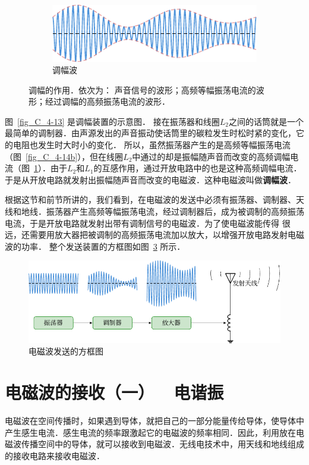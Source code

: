 \begin{figure}[htbp]
\begin{minipage}[b]{0.7\linewidth}
    	\\
    	\begin{subfigure}{0.9\linewidth}
    		\centering
    		\includegraphics{fig/C/4-14c.pdf}
    		\caption{调幅波}\label{fig_C_4-14c}
    	\end{subfigure}
    	\caption{调幅的作用．依次为：
    		声音信号的波形；高频等幅振荡电流的波形；经过调幅的高频振荡电流的波形．}\label{fig_C_4-14}
    \end{minipage}
\end{figure}



图~\ref{fig_C_4-13} 是调幅装置的示意图．
接在振荡器和线圈$L_2$之间的话筒就是一个最简单的调制器．由声源发出的声音振动使话筒里的碳粒发生时松时紧的变化，它的电阻也发生时大时小的变化．
所以，虽然振荡器产生的是高频等幅振荡电流
（图~\ref{fig_C_4-14b}），但在线圈$L_2$中通过的却是振幅随声音而改变的高频调幅电流（图~\ref{fig_C_4-14c}）．由于$L_2$和$L_1$的互感作用，通过开放电路中的也是这种高频调幅电流．
于是从开放电路就发射出振幅随声音而改变的电磁波．这种电磁波叫做\textbf{调幅波}．

根据这节和前节所讲的，我们看到，在电磁波的发送中必须有振荡器、调制器、天线和地线．振荡器产生高频等幅振荡电流，经过调制器后，成为被调制的高频振荡电流，于是开放电路就发射出带有调制信号的电磁波．为了使电磁波能传得
很远，还需要用放大器把被调制的高频振荡电流加以放大，以增强开放电路发射电磁波的功率．
整个发送装置的方框图如图~\ref{fig_C_4-15} 所示．
\begin{figure}[htbp]
    \centering
    \includegraphics{fig/C/4-15.pdf}
    \caption{电磁波发送的方框图}\label{fig_C_4-15}
\end{figure}

\section{电磁波的接收（一）~~电谐振}
电磁波在空间传播时，如果遇到导体，就把自己的一部分能量传给导体，使导体中产生感生电流．感生电流的频率跟激起它的电磁波的频率相同．因此，利用放在电磁波传播空间中的导体，就可以接收到电磁波．无线电技术中，用天线和地线组成的接收电路来接收电磁波．

